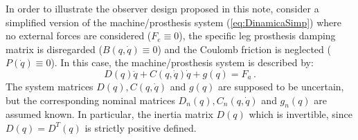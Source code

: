 \documentclass[letterpaper, 10 pt, conference]{ieeeconf}  %
\theoremstyle{plain}
\theoremstyle{definition}
\theoremstyle{remark}
\begin{document}
In order to illustrate the observer design proposed in this note, consider a simplified version of the machine/prosthesis system (\ref{eq:DinamicaSimp}) where no external forces are considered ($F_e \equiv 0$), the specific leg prosthesis damping matrix is disregarded ($B(q,\dot{q}) \equiv 0$) and the  Coulomb friction is neglected  ($P(\dot{q}) \equiv 0$). In this case, the machine/prosthesis system is described by:
%
\begin{equation}
D(q)\ddot{q} + C(q,\dot{q})\dot{q}+g(q) = F_a\,.
\label{eq:DinamicaSimp}
\end{equation}
%
The system matrices $D(q), C(q,\dot{q})$ and $g(q)$ are supposed to be uncertain, but the corresponding nominal matrices  $D_n(q), C_n(q,\dot{q})$ and $g_n(q)$ are assumed known. In particular, the inertia matrix $D(q)$ which is invertible, since $D(q)=D^T(q)$ is strictly positive defined.
\end{document}
